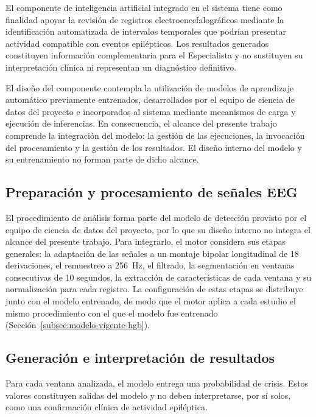 El componente de inteligencia artificial integrado en el sistema tiene como finalidad apoyar la revisión de
registros electroencefalográficos mediante la
identificación automatizada de intervalos temporales
que podrían presentar actividad compatible con
eventos epilépticos. Los resultados generados
constituyen información complementaria para el
Especialista y no sustituyen su interpretación
clínica ni representan un diagnóstico definitivo.

El diseño del componente contempla la utilización de modelos de aprendizaje automático previamente entrenados, desarrollados por el equipo de ciencia de datos del proyecto e incorporados al sistema mediante mecanismos de carga y ejecución de inferencias.
En consecuencia, el alcance del presente trabajo comprende la integración del modelo: la gestión de las ejecuciones, la invocación del procesamiento y la gestión de los resultados.
El diseño interno del modelo y su entrenamiento no forman parte de dicho alcance.

\subsection{Preparación y procesamiento de señales EEG}
\label{subsec:preparacion-procesamiento-eeg-ia}

El procedimiento de análisis forma parte del modelo de detección provisto por el equipo de ciencia de datos del proyecto, por lo que su diseño interno no integra el alcance del presente trabajo.
Para integrarlo, el motor considera sus etapas generales: la adaptación de las señales a un montaje bipolar longitudinal de 18 derivaciones, el remuestreo a 256~Hz, el filtrado, la segmentación en ventanas consecutivas de 10 segundos, la extracción de características de cada ventana y su normalización para cada registro.
La configuración de estas etapas se distribuye junto con el modelo entrenado, de modo que el motor aplica a cada estudio el mismo procedimiento con el que el modelo fue entrenado (Sección~\ref{subsec:modelo-vigente-hgb}).

\subsection{Generación e interpretación de resultados}
\label{subsec:generacion-interpretacion-resultados-ia}

Para cada ventana analizada, el modelo entrega una probabilidad de crisis.
Estos valores constituyen salidas del modelo y no deben interpretarse, por sí solos, como una confirmación clínica de actividad epiléptica.

